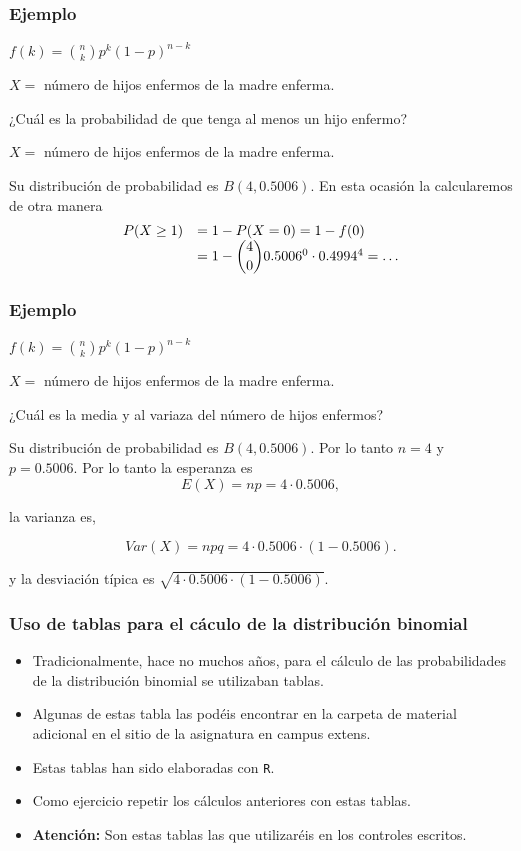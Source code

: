 \begin{frame}
\frametitle{Ejemplo}
$f(k)=\binom{n}{k}p^k(1-p)^{n-k}$
\medskip

$X=$ número de hijos enfermos de la  madre enferma.
\medskip

¿Cuál es la probabilidad de que tenga al menos un hijo enfermo?
\medskip\pause

$X=$ número de hijos enfermos de la  madre enferma.
\medskip

Su distribución de probabilidad es  $B(4,0.5006)$. En  esta ocasión la calcularemos de otra manera 
$$
\begin{array}{rl}
P(X\geq 1) & =1-P(X=0)=1-f(0)\\ & =1-
\dbinom{4}{0}0.5006^0\cdot 0.4994^4=\ldots
\end{array}
$$
\end{frame}


\begin{frame}
\frametitle{Ejemplo}
$f(k)=\binom{n}{k}p^k(1-p)^{n-k}$
\medskip

$X=$ número de hijos enfermos de la  madre enferma.
\medskip

¿Cuál es la media y al variaza del número de hijos enfermos?
\medskip\pause


Su distribución de probabilidad es  $B(4,0.5006)$. Por lo tanto $n=4$ y $p=0.5006$. Por lo tanto la esperanza es
$$E(X)= n p = 4\cdot 0.5006,$$

la varianza es,

$$Var(X)= n p q =  4\cdot 0.5006\cdot (1-0.5006).$$

y la desviación típica es $\sqrt{4\cdot 0.5006\cdot (1-0.5006)}$.
\end{frame}

\begin{frame}
\frametitle{Uso de tablas  para el cáculo de la distribución binomial}
\begin{itemize}
\item Tradicionalmente, hace no muchos años, para el cálculo de las probabilidades de la distribución binomial se utilizaban  tablas.
\item Algunas de estas tabla las podéis encontrar en la carpeta de material adicional en el sitio de la asignatura en campus extens.
\item Estas tablas han sido elaboradas con \texttt{R}.
\item Como ejercicio repetir los cálculos anteriores con estas tablas. 
\item \textbf{Atención:} Son estas tablas las que utilizaréis en los controles escritos.
\end{itemize}
\end{frame}

